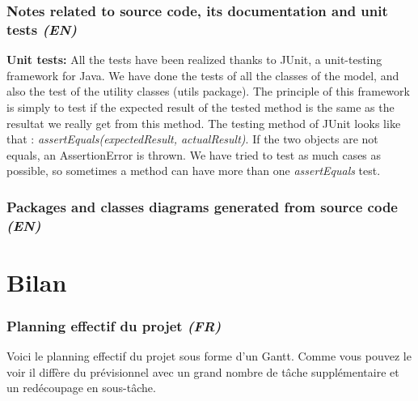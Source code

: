 \documentclass[paper=a4, fontsize=11pt]{report}
\numberwithin{equation}{section}		%
\numberwithin{figure}{section}		%
\numberwithin{table}{section}		%
\renewcommand{\bf}[1]{\textbf{#1}}
\renewcommand{\it}[1]{\textit{#1}}
\newcommand{\Todo}[1]{\todo[inline]{#1}}
\begin{document}
\section{Notes related to source code, its documentation and unit tests \it{(EN)}}
\label{sec:notes-related-to-source-code}

\bf{Unit tests:} All the tests have been realized thanks to JUnit, a unit-testing framework for Java. We have done the tests of all the classes of the model, and also the test of the utility classes (utils package). The principle of this framework is simply to test if the expected result of the tested method is the same as the resultat we really get from this method. The testing method of JUnit looks like that : \it{assertEquals(expectedResult, actualResult)}. If the two objects are not equals, an AssertionError is thrown. We have tried to test as much cases as possible, so sometimes a method can have more than one \it{assertEquals} test.

\section{Packages and classes diagrams generated from source code \it{(EN)}}
\label{sec:packages-and-classes-diagrams-generated-from-source-code}

\Todo{Retro-generated diagrams}



















\part{Bilan}
\label{part:bilan}
\setcounter{section}{0}

\section{Planning effectif du projet \it{(FR)}}
\label{sec:planning-effectif-du-projet}

Voici le planning effectif du projet sous forme d'un Gantt. Comme vous pouvez le voir il diffère du prévisionnel avec un grand nombre de tâche supplémentaire et un redécoupage en sous-tâche.
\end{document}
